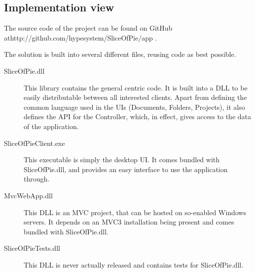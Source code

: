 \subsection{Implementation view}
\label{sec:implementationview}

The source code of the project can be found on GitHub at\newline http://github.com/hypesystem/SliceOfPie/app .

The solution is built into several different files, reusing code as best possible.

\begin{description}
	\item[SliceOfPie.dll] This library contains the general \SOP{} centric code. It is built into a
        DLL to be easily distributable between all interested clients. Apart from defining the common
        language used in the UIs (Documents, Folders, Projects), it also defines the API for the
        Controller, which, in effect, gives access to the data of the application.
    \item[SliceOfPieClient.exe] This executable is simply the desktop UI. It comes bundled with
        SliceOfPie.dll, and provides an easy interface to use the application through.
    \item[MvcWebApp.dll] This DLL is an MVC project, that can be hosted on so-enabled Windows servers.
        It depends on an MVC3 installation being present and comes bundled with SliceOfPie.dll.
    \item[SliceOfPieTests.dll] This DLL is never actually released and contains tests for SliceOfPie.dll.
\end{description}
